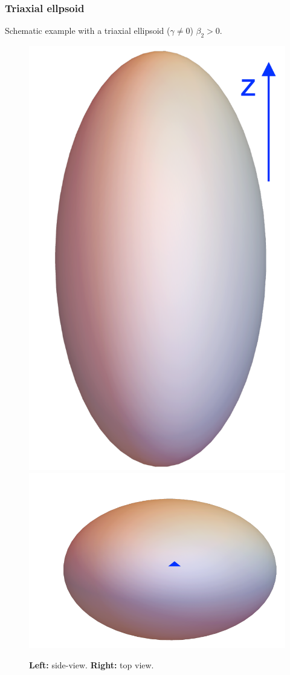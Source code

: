 \documentclass{beamer}
\begin{document}
\begin{frame}
  \frametitle{Triaxial ellpsoid}
  Schematic example with a triaxial ellipsoid ($\gamma\neq0$)  $\beta_2>0$.
  \begin{figure}
    \includegraphics[scale=0.25]{figures/ellipsoid-side-view-2.pdf}
    \includegraphics[scale=0.3]{figures/ellipsoid-top-view.pdf}
    \caption{\textbf{Left:} side-view. \textbf{Right:} top view.}
  \end{figure}
\end{frame}
\end{document}
